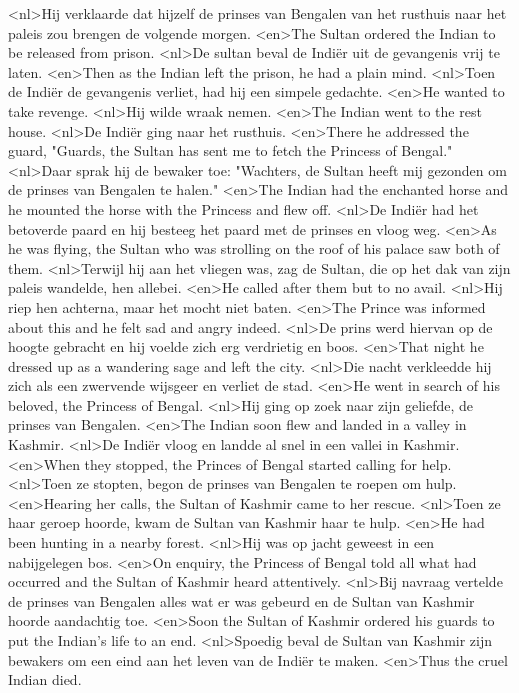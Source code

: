 <nl>Hij verklaarde dat hijzelf de prinses van Bengalen van het rusthuis naar het paleis zou brengen  de volgende morgen.
<en>The Sultan ordered the Indian to be released from prison.
<nl>De sultan beval  de Indi\"er uit de gevangenis vrij te laten.
<en>Then as the Indian left the prison, he had a plain mind.
<nl>Toen de Indi\"er de gevangenis verliet, had hij een simpele gedachte.
<en>He wanted to take revenge.
<nl>Hij wilde wraak nemen.
<en>The Indian went to the rest house.
<nl>De Indi\"er ging naar het rusthuis.
<en>There he addressed the guard, "Guards, the Sultan has sent me to fetch the Princess of Bengal."
<nl>Daar sprak hij de bewaker toe: "Wachters, de Sultan heeft mij gezonden om de prinses van Bengalen te halen."
<en>The Indian had the enchanted horse and he mounted the horse with the Princess and flew off.
<nl>De Indi\"er had het betoverde paard en hij besteeg het paard met de prinses en vloog weg.
<en>As he was flying, the Sultan who was strolling on the roof of his palace saw both of them.
<nl>Terwijl hij aan het vliegen was, zag de Sultan, die op het dak van zijn paleis wandelde, hen allebei.
<en>He called after them but to no avail.
<nl>Hij riep hen achterna, maar het mocht niet baten.
<en>The Prince was informed about this and he felt sad and angry indeed.
<nl>De prins werd hiervan op de hoogte gebracht en hij voelde zich erg verdrietig en boos.
<en>That night he dressed up as a wandering sage and left the city.
<nl>Die nacht verkleedde hij zich als een zwervende wijsgeer en verliet de stad.
<en>He went in search of his beloved, the Princess of Bengal.
<nl>Hij ging op zoek naar zijn geliefde, de prinses van Bengalen.
<en>The Indian soon flew and landed in a valley in Kashmir.
<nl>De Indi\"er vloog en landde  al snel in een vallei in Kashmir.
<en>When they stopped, the Princes of Bengal started calling for help.
<nl>Toen ze stopten, begon de prinses van Bengalen te roepen om hulp.
<en>Hearing her calls, the Sultan of Kashmir came to her rescue.
<nl>Toen ze haar geroep hoorde, kwam de Sultan van Kashmir haar te hulp.
<en>He had been hunting in a nearby forest.
<nl>Hij was op jacht geweest in een nabijgelegen bos.
<en>On enquiry, the Princess of Bengal told all what had occurred and the Sultan of Kashmir heard attentively.
<nl>Bij navraag vertelde de prinses van Bengalen alles wat er was gebeurd en de Sultan van Kashmir hoorde aandachtig toe.
<en>Soon the Sultan of Kashmir ordered his guards to put the Indian's life to an end.
<nl>Spoedig beval de Sultan van Kashmir zijn bewakers om een eind aan het leven van de Indi\"er te maken.
<en>Thus the cruel Indian died.
